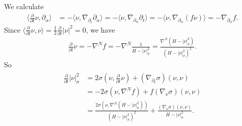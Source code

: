 \documentclass[11pt, letterpaper]{amsart}
\theoremstyle{definition}
\theoremstyle{remark}
\begin{document}
\begin{appendix}
	We calculate 
	\begin{align*}
		\langle \frac{\partial }{\partial  t} \nu, \partial _{\alpha }  \rangle &= - \langle \nu , \nabla _{\partial _t} \partial _{\alpha } \rangle
									= - \langle \nu , \nabla _{\partial _{\alpha }} \partial _t \rangle 
									= - \langle \nu , \nabla _{\partial _{\alpha }} (f \nu ) \rangle = - \nabla _{\partial _\alpha } f.
	\end{align*} 
	Since $\langle \frac{\partial }{\partial  t} \nu , \nu  \rangle= \frac{1}{2} \frac{\partial }{\partial  t} |\nu |^2 = 0$, we have
	\begin{align}
		\frac{\partial }{\partial  t} \nu = - \nabla ^{N} f = - \nabla ^{N} \frac{1}{H- |\nu |^2_{\sigma }} = \frac{\nabla ^{N}(H-|\nu |^2_\sigma )}{(H- |\nu |^2_\sigma )^2}.
	\end{align}
	So
	\begin{align}
		\begin{split}
			\frac{\partial }{\partial  t}|\nu |^2_{\sigma } &= 2\sigma ( \nu, \frac{\partial }{\partial t} \nu ) +  (\nabla _{\partial _t}\sigma ) (\nu , \nu )\\
							&= -2 \sigma \left(  \nu,  \nabla ^{N} f \right) + f (\nabla _{\nu } \sigma )(\nu ,\nu )\\
						&= \frac{2 \sigma(\nu , \nabla ^{N}(H- |\nu |^2_{\sigma }) )}{(H- |\nu |^2_{\sigma })^2} + \frac{(\nabla _{\nu } \sigma ) (\nu , \nu )}{H- |\nu |^2_{\sigma }}.
		\end{split}
	\end{align} 


\end{appendix}
\end{document}
